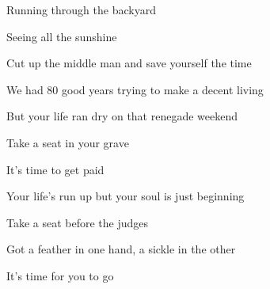 \begin{strophe*}
  Running through the backyard

  \chord[c]{\null}Seeing all the sunshine

  Cut up the middle man and save yourself the time

  We had 80 good years trying to make a decent living

  But your life ran dry on that renegade weekend


  Take a seat in your grave

  \chord[c]{\null}It's time to get paid

  Your life's run up but your soul is just beginning

  Take a seat before the judges

  Got a feather in one hand, a sickle in the other

  It's time for you to go
\end{strophe*}
